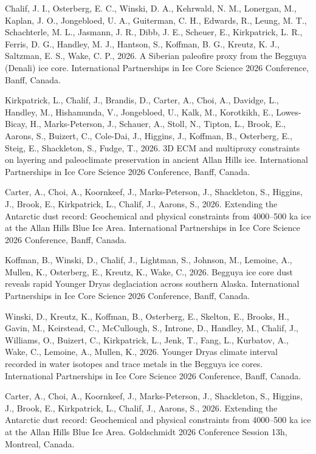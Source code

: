 \documentclass[a4paper,11pt]{article}
\begin{document}
\item[] Chalif, J. I., Osterberg, E. C., Winski, D. A., Kehrwald, N. M., Lonergan, M., Kaplan, J. O., Jongebloed, U. A., Guiterman, C. H., Edwards, R., Leung, M. T., Schachterle, M. L., Jasmann, J. R., Dibb, J. E., Scheuer, E., Kirkpatrick, L. R., Ferris, D. G., Handley, M. J., Hantson, S., Koffman, B. G., Kreutz, K. J., Saltzman, E. S., Wake, C. P., 2026. A Siberian paleofire proxy from the Begguya (Denali) ice core. International Partnerships in Ice Core Science 2026 Conference, Banff, Canada.

\item[] Kirkpatrick, L., Chalif, J., Brandis, D., Carter, A., Choi, A., Davidge, L., Handley, M., Hishamunda, V., Jongebloed, U., Kalk, M., Korotkikh, E., Lowes-Bicay, H., Marks-Peterson, J., Schauer, A., Stoll, N., Tipton, L., Brook, E., Aarons, S., Buizert, C., Cole-Dai, J., Higgins, J., Koffman, B., Osterberg, E., Steig, E., Shackleton, S., Fudge, T., 2026. 3D ECM and multiproxy constraints on layering and paleoclimate preservation in ancient Allan Hills ice. International Partnerships in Ice Core Science 2026 Conference, Banff, Canada.

\item[] Carter, A., Choi, A., Koornkeef, J., Marks-Peterson, J., Shackleton, S., Higgins, J., Brook, E., Kirkpatrick, L., Chalif, J., Aarons, S., 2026. Extending the Antarctic dust record: Geochemical and physical constraints from 4000--500 ka ice at the Allan Hills Blue Ice Area. International Partnerships in Ice Core Science 2026 Conference, Banff, Canada.

\item[] Koffman, B., Winski, D., Chalif, J., Lightman, S., Johnson, M., Lemoine, A., Mullen, K., Osterberg, E., Kreutz, K., Wake, C., 2026. Begguya ice core dust reveals rapid Younger Dryas deglaciation across southern Alaska. International Partnerships in Ice Core Science 2026 Conference, Banff, Canada.

\item[] Winski, D., Kreutz, K., Koffman, B., Osterberg, E., Skelton, E., Brooks, H., Gavin, M., Keirstead, C., McCullough, S., Introne, D., Handley, M., Chalif, J., Williams, O., Buizert, C., Kirkpatrick, L., Jenk, T., Fang, L., Kurbatov, A., Wake, C., Lemoine, A., Mullen, K., 2026. Younger Dryas climate interval recorded in water isotopes and trace metals in the Begguya ice cores. International Partnerships in Ice Core Science 2026 Conference, Banff, Canada.

\item[] Carter, A., Choi, A., Koornkeef, J., Marks-Peterson, J., Shackleton, S., Higgins, J., Brook, E., Kirkpatrick, L., Chalif, J., Aarons, S., 2026. Extending the Antarctic dust record: Geochemical and physical constraints from 4000--500 ka ice at the Allan Hills Blue Ice Area. Goldschmidt 2026 Conference Session 13h, Montreal, Canada.
\end{document}

